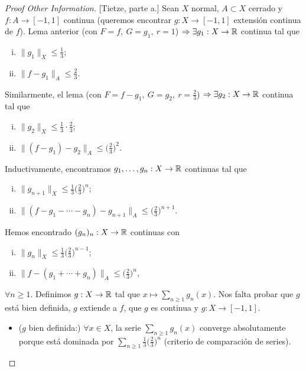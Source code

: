\begin{proof}[Proof Other Information][Tietze, parte a.]
	Sean $X$ normal, $A \subset X$ cerrado y $f : A \to [-1,1]$ continua (queremos encontrar $g : X \to [-1,1]$ extensión continua de $f$). Lema anterior (con $F = f,\ G = g_{1},\ r=1$) $\Rightarrow \exists g_{1} : X \to \mathbb{R}$ continua tal que
	\begin{enumerate}[i)]
		\item $\| g_{1} \|_{X} \leq \frac{1}{3}$;

		\item $\| f - g_{1} \|_{A} \leq \frac{2}{3}$.
	\end{enumerate}
	Similarmente, el lema (con $F = f-g_{1},\ G = g_{2},\ r = \frac{2}{3}$) $\Rightarrow \exists g_{2} : X \to \mathbb{R}$ continua tal que
	\begin{enumerate}[i)]
		\item $\| g_{2} \|_{X} \leq \frac{1}{3} \cdot \frac{2}{3}$;

		\item $\| (f - g_{1}) - g_{2} \|_{A} \leq \big(\frac{2}{3}\big)^{2}$.
	\end{enumerate}
	Inductivamente, encontramos $g_{1},\dots,g_{n} : X \to \mathbb{R}$ continuas tal que
	\begin{enumerate}[i)]
		\item $\| g_{n+1} \|_{X} \leq \frac{1}{3} \big(\frac{2}{3}\big)^{n}$;

		\item $\| (f - g_{1} - \cdots - g_{n}) - g_{n+1} \|_{A} \leq \big(\frac{2}{3}\big)^{n+1}$.
	\end{enumerate}
	Hemos encontrado $(g_{n})_{n} : X \to \mathbb{R}$ continuas con
	\begin{enumerate}[i)]
		\item $\| g_{n} \|_{X} \leq \frac{1}{3}\big(\frac{2}{3}\big)^{n-1}$;

		\item $\| f - (g_{1} + \cdots + g_{n}) \|_{A} \leq \big(\frac{2}{3}\big)^{n}$,
	\end{enumerate}
	$\forall n \geq 1$. Definimos $g : X \to \mathbb{R}$ tal que $x \mapsto \sum_{n \geq 1}^{} g_{n}(x)$. Nos falta probar que $g$ está bien definida, $g$ extiende a $f$, que $g$ es continua y $g : X \to [-1,1]$.
	\begin{itemize}
		\item ($g$ bien definida:) $\forall x \in X$, la serie $\sum_{n \geq 1}^{} g_{n}(x)$ converge absolutamente porque está dominada por $\sum_{n \geq 1}^{} \frac{1}{3} \big(\frac{2}{3}\big)^{n}$ (criterio de comparación de series).


\end{itemize}
\end{proof}
